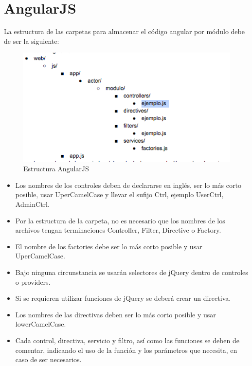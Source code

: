 \section{AngularJS}
La estructura de las carpetas para almacenar el código angular por módulo debe de ser la siguiente:
				\begin{figure}[htbp!]
		\centering
			\includegraphics[width=1\textwidth]{images/estructura}
		\caption{Estructura AngularJS}
	\end{figure}

\begin{itemize}
	\item Los nombres de los controles deben de declararse en inglés, ser lo más corto posible, usar UperCamelCase y llevar el sufijo Ctrl, ejemplo UserCtrl, AdminCtrl.

	\item Por la estructura de la carpeta, no es necesario que los nombres de los archivos tengan terminaciones Controller, Filter, Directive o Factory.

	\item El nombre de los factories debe ser lo más corto posible y usar UperCamelCase.

	\item Bajo ninguna circunstancia se usarán selectores de jQuery dentro de controles o providers.

	\item Si se requieren utilizar funciones de jQuery se deberá crear un directiva.

	\item Los nombres de las directivas deben ser lo más corto posible y usar lowerCamelCase.

	\item Cada control, directiva, servicio y filtro, así como las funciones se deben de comentar, indicando el uso de la función y los parámetros que necesita, en caso de ser necesarios.

\end{itemize}

